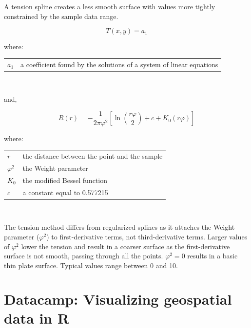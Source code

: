 \documentclass{article}
\makeatletter
\newenvironment{conditions}[1][where:] 
  {#1 \begin{tabular}[t]{>{$}l<{$} @{${}={}$} l}}
  {\end{tabular}\\[\belowdisplayskip]}
\makeatother
\begin{document}
A tension spline creates a less smooth surface with values more tightly constrained by the sample data range.

\[T(x, y) = a_{1} \]

\begin{conditions}
    a_{1} & a coefficient found by the solutions of a system of linear equations
\end{conditions}

and, 

\[R(r) = - \frac{1}{2 \pi \varphi^2} \left[\ln\left(\frac{r \varphi}{2}\right) + c + K_0 \left(r \varphi\right)\right]\]

\begin{conditions}
    r & the distance between the point and the sample \\
    \varphi^2 & the Weight parameter \\
    K_0 & the modified Bessel function \\
    c & a constant equal to 0.577215
\end{conditions}

The tension method differs from regularized splines as it attaches the Weight parameter ($\varphi^2$) to first-derivative terms, not third-derivative terms.
Larger values of $\varphi^2$  lower the tension and result in a coarser surface as the first-derivative surface is not smooth, passing through all the points.
$\varphi^2 = 0$ results in a basic thin plate surface.
Typical values range between 0 and 10.

\section{Datacamp: Visualizing geospatial data in R}
\end{document}
